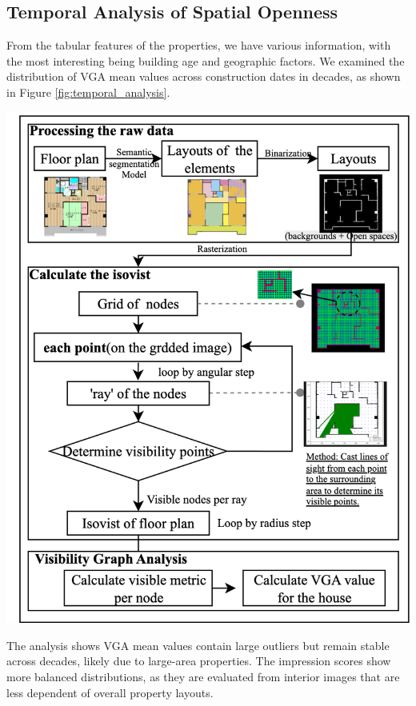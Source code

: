 \documentclass[11pt,a4paper]{article}
\begin{document}
\begin{multicols}{2}
\subsection{Temporal Analysis of Spatial Openness}
From the tabular features of the properties, we have various information, with the most interesting 
being building age and geographic factors. 
We examined the distribution of VGA mean values across construction dates in decades, as shown in 
Figure \ref{fig:temporal_analysis}.
\begin{center}
    \includegraphics[width=0.9\columnwidth]{plots/vga_process.png}
    \label{fig:madori_processing}
\end{center}

The analysis shows VGA mean values contain large outliers but remain stable across decades, likely due to large-area properties. 
The impression scores show more balanced distributions, as they are evaluated from interior images that are less dependent of overall property layouts.


\end{multicols}
\end{document}
